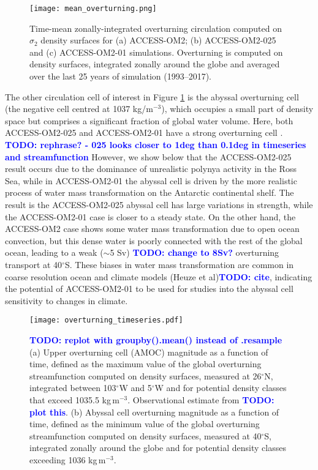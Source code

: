\documentclass[gmd, manuscript]{copernicus}
\newcommand{\TODO}[1]{\textcolor{blue}{\textsf{\textbf{TODO: #1}}}}
\begin{document}
\begin{figure}[t]
\texttt{[image: mean\_overturning.png]}
\caption{Time-mean zonally-integrated overturning circulation computed on $\sigma_2$ density surfaces for (a) ACCESS-OM2; (b) ACCESS-OM2-025 and (c) ACCESS-OM2-01 simulations. Overturning is computed on density surfaces, integrated zonally around the globe and averaged over the last 25 years of simulation (1993--2017). \label{fig:overturning}}
\end{figure}

The other circulation cell of interest in Figure \ref{fig:overturning} is the abyssal overturning cell (the negative cell centred at 1037 kg/m$^{-3}$), which occupies a small part of density space but comprises a significant fraction of global water volume.
Here, both ACCESS-OM2-025 and ACCESS-OM2-01 have a strong overturning cell \citep[10--15\,Sv at $40^\circ$S, see figure \ref{fig:overturning_timeseries}b; compared with poorly constrained observational estimates of 20--50,Sv;][]{Sloyan2001,Lumpkin2007,Talley2013}.
\TODO{rephrase? - 025 looks closer to 1deg than 0.1deg in timeseries and streamfunction}
However, we show below that the ACCESS-OM2-025 result occurs due to the dominance of unrealistic polynya activity in the Ross Sea, while in ACCESS-OM2-01 the abyssal cell is driven by the more realistic process of water mass transformation on the Antarctic continental shelf.
The result is the ACCESS-OM2-025 abyssal cell has large variations in strength, while the ACCESS-OM2-01 case is closer to a steady state.
On the other hand, the ACCESS-OM2 case shows some water mass transformation due to open ocean convection, but this dense water is poorly connected with the rest of the global ocean, leading to a weak ($\sim$5 Sv) \TODO{change to 8Sv?} overturning transport at 40$^\circ$S.
These biases in water mass transformation are common in coarse resolution ocean and climate models (Heuze et al)\TODO{cite}, indicating the potential of ACCESS-OM2-01 to be used for studies into the abyssal cell sensitivity to changes in climate.

\begin{figure}[t]
\texttt{[image: overturning\_timeseries.pdf]}
\caption{
\TODO{replot with groupby().mean() instead of .resample} 
(a) Upper overturning cell (AMOC) magnitude as a function of time, defined as the maximum value of the global overturning streamfunction computed on density surfaces, measured at 26$^\circ$N, integrated between 103$^\circ$W and 5$^\circ$W and for potential density classes that exceed 1035.5 kg\,m$^{-3}$. Observational estimate from \citet{McCarthy:2015} \TODO{plot this}. (b) Abyssal cell overturning magnitude as a function of time, defined as the minimum value of the global overturning streamfunction computed on density surfaces, measured at 40$^\circ$S, integrated zonally around the globe and for potential density classes exceeding 1036 kg\,m$^{-3}$. \label{fig:overturning_timeseries}}
\end{figure}
\end{document}
